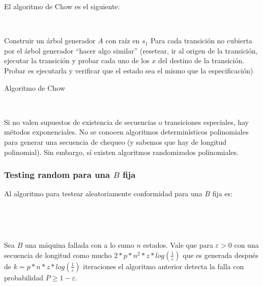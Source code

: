 \documentclass[]{article}
\begin{document}
El algoritmo de Chow es el siguiente:

~\newline
\begin{algorithm}[H]
	\SetAlgoLined
	Construir un árbol generador $A$ con raíz en $s_1$\;
	Para cada transición no cubierta por el árbol generador ``hacer algo similar'' (resetear, ir al origen de la transición, ejecutar la transición y probar cada uno de los $x$ del destino de la transición. Probar es ejecutarla y verificar que el estado sea el mismo que la especificación)\;
	\caption{Algoritmo de Chow}
\end{algorithm}
~\newline

Si no valen supuestos de existencia de secuencias o transiciones especiales, hay métodos exponenciales. No se conocen algoritmos determinísticos polinomiales para generar una secuencia de chequeo (y sabemos que hay de longitud polinomial). Sin embargo, sí existen algoritmos randomizados polinomiales.

\subsubsection{Testing random para una $B$ fija}
Al algoritmo para testear aleatoriamente conformidad para una $B$ fija es: %

~\newline
\begin{algorithm}[H]
\end{algorithm}
~\newline

Sea $B$ una máquina fallada con a lo sumo $n$ estados. Vale que para $\varepsilon>0$ con una secuencia de longitud como mucho $\displaystyle 2*p*n^2*z*log(\frac{1}{\varepsilon})$ que es generada después de $\displaystyle k=p*n*z*log(\frac{1}{\varepsilon})$ iteraciones el algoritmo anterior detecta la falla con probabilidad $\displaystyle P \geq 1-\varepsilon$.
\end{document}
